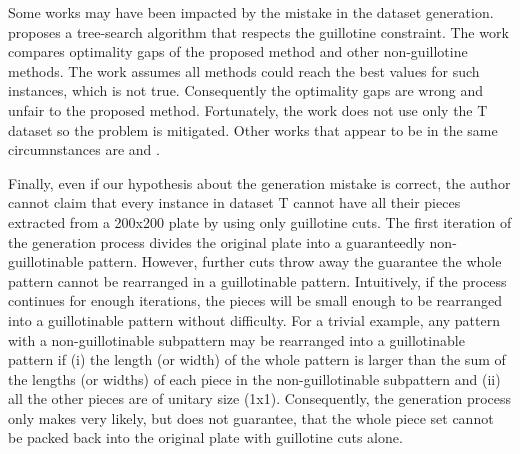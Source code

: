 Some works may have been impacted by the mistake in the dataset generation.
\citet{bortfeldt:2012} %
proposes a tree-search algorithm that respects the guillotine constraint.
The work compares optimality gaps of the proposed method and other non-guillotine methods.
The work assumes all methods could reach the best values for such instances, which is not true.
Consequently the optimality gaps are wrong and unfair to the proposed method.
Fortunately, the work does not use only the T dataset so the problem is mitigated.
Other works that appear to be in the same circumnstances are
\citet{thomas:2014} and %
\citet{shang:2020}. %

Finally, even if our hypothesis about the generation mistake is correct, the author cannot claim that every instance in dataset T cannot have all their pieces extracted from a 200x200 plate by using only guillotine cuts.
The first iteration of the generation process divides the original plate into a guaranteedly non-guillotinable pattern.
However, further cuts throw away the guarantee the whole pattern cannot be rearranged in a guillotinable pattern.
Intuitively, if the process continues for enough iterations, the pieces will be small enough to be rearranged into a guillotinable pattern without difficulty.
For a trivial example, any pattern with a non-guillotinable subpattern may be rearranged into a guillotinable pattern if (i) the length (or width) of the whole pattern is larger than the sum of the lengths (or widths) of each piece in the non-guillotinable subpattern and (ii) all the other pieces are of unitary size (1x1).
Consequently, the generation process only makes very likely, but does not guarantee, that the whole piece set cannot be packed back into the original plate with guillotine cuts alone.

